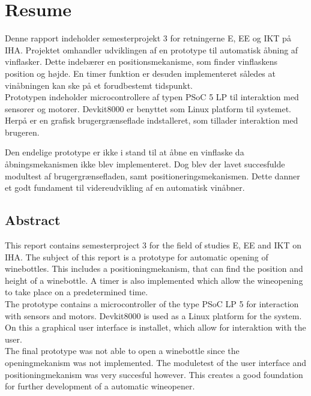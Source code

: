 \chapter{Resume}

Denne rapport indeholder semesterprojekt 3 for retningerne E, EE og IKT på IHA. Projektet omhandler udviklingen af en
prototype til automatisk åbning af vinflasker. Dette indebærer en positionsmekanisme, som finder vinflaskens position og højde.
En timer funktion er desuden implementeret således at vinåbningen kan ske på et forudbestemt tidspunkt.\\

Prototypen indeholder microcontrollere af typen PSoC 5 LP til interaktion med sensorer og motorer. Devkit8000 er benyttet som 
Linux platform til systemet. Herpå er en grafisk brugergrænseflade indstalleret, som tillader interaktion med brugeren.   

Den endelige prototype er ikke i stand til at åbne en vinflaske da åbningsmekanismen ikke blev implementeret. Dog blev der lavet 
succesfulde modultest af brugergrænsefladen, samt positioneringsmekanismen. Dette danner et godt fundament til videreudvikling af
en automatisk vinåbner. 

\section{Abstract}
This report contains semesterproject 3 for the field of studies E, EE and IKT on IHA. The subject of this report is a prototype 
for automatic opening of winebottles. This includes a positioningmekanism, that can find the position and height of a winebottle.
A timer is also implemented which allow the wineopening to take place on a predetermined time.\\

The prototype contains a microcontroller of the type PSoC LP 5 for interaction with sensors and motors. Devkit8000 is used as a
Linux platform for the system. On this a graphical user interface is installet, which allow for interaktion with the user.\\

The final prototype was not able to open a winebottle since the openingmekanism was not implemented. The moduletest of the
user interface and positioningmekanism was very succesful however. This creates a good foundation for further development of
a automatic wineopener.      